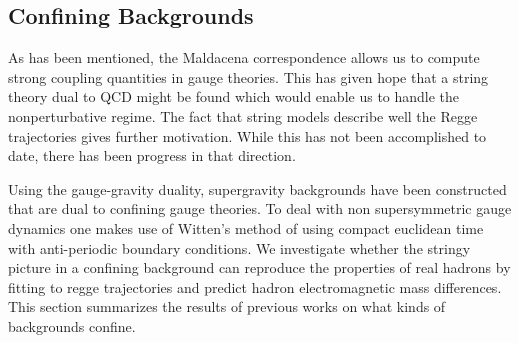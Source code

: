 \documentclass[11pt,a4paper]{article}
\begin{document}
\FloatBarrier
\subsection{Confining Backgrounds}
As has been mentioned, the Maldacena correspondence allows us to compute strong coupling quantities in gauge theories. This has given hope that a string theory dual to QCD might be found which would enable us to handle the nonperturbative regime. The fact that string models describe well the Regge trajectories gives further motivation. While this has not been accomplished to date, there has been progress in that direction.

Using the gauge-gravity duality, supergravity backgrounds have been constructed that are dual to confining gauge theories. To deal with non supersymmetric gauge dynamics one makes use of Witten's method \cite{Witten98,Kuperstein04} of  using compact euclidean time with anti-periodic boundary conditions. We investigate whether the stringy picture in a confining background can reproduce the properties of real hadrons by fitting to regge trajectories and predict hadron electromagnetic mass differences. This section summarizes the results of previous works on what kinds of backgrounds confine.  

\FloatBarrier
\end{document}
